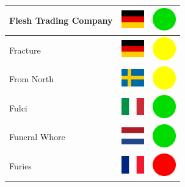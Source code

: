 \documentclass[12pt, a4paper, twoside]{report}
\begin{document}
\begin{center}
\begin{longtable}{|p{5cm}|p{2cm}|p{2cm}|}
Flesh Trading Company & \includegraphics[width=1cm]{4x3/de} & \includegraphics[width=1cm]{likes/y} \\ \hline
Fracture & \includegraphics[width=1cm]{4x3/de} & \includegraphics[width=1cm]{likes/m} \\ \hline
From North & \includegraphics[width=1cm]{4x3/se} & \includegraphics[width=1cm]{likes/m} \\ \hline
Fulci & \includegraphics[width=1cm]{4x3/it} & \includegraphics[width=1cm]{likes/y} \\ \hline
Funeral Whore & \includegraphics[width=1cm]{4x3/nl} & \includegraphics[width=1cm]{likes/y} \\ \hline
Furies & \includegraphics[width=1cm]{4x3/fr} & \includegraphics[width=1cm]{likes/n} \\ \hline

\end{longtable}
\end{center}
\end{document}
